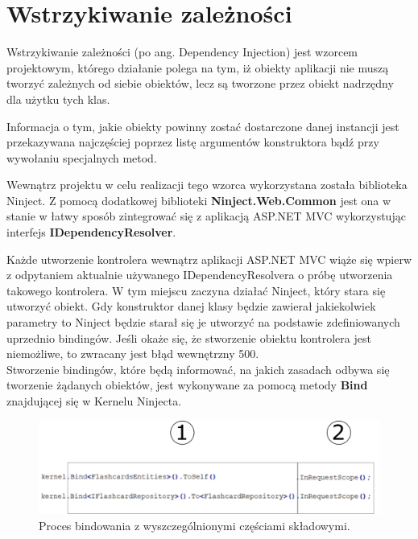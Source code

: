 \section{Wstrzykiwanie zależności}

Wstrzykiwanie zależności (po ang. Dependency Injection) jest wzorcem projektowym, którego działanie polega na tym, iż obiekty aplikacji nie muszą tworzyć zależnych od siebie obiektów, lecz są tworzone przez obiekt nadrzędny dla użytku tych klas. 

Informacja o tym, jakie obiekty powinny zostać dostarczone danej instancji jest przekazywana najczęściej poprzez listę argumentów konstruktora bądź przy wywołaniu specjalnych metod.

Wewnątrz projektu w celu realizacji tego wzorca wykorzystana została biblioteka Ninject\cite{NinjectGithub}. Z pomocą dodatkowej biblioteki \textbf{Ninject.Web.Common} jest ona w stanie w łatwy sposób zintegrować się z aplikacją ASP.NET MVC wykorzystując interfejs \textbf{IDependencyResolver}. 

Każde utworzenie kontrolera wewnątrz aplikacji ASP.NET MVC wiąże się wpierw z odpytaniem aktualnie używanego IDependencyResolvera o próbę utworzenia takowego kontrolera. W tym miejscu zaczyna działać Ninject, który stara się utworzyć obiekt. Gdy konstruktor danej klasy będzie zawierał jakiekolwiek parametry to Ninject będzie starał się je utworzyć na podstawie zdefiniowanych uprzednio bindingów. Jeśli okaże się, że stworzenie obiektu kontrolera jest niemożliwe, to zwracany jest błąd wewnętrzny 500.
\\
Stworzenie bindingów, które będą informować, na jakich zasadach odbywa się tworzenie żądanych obiektów, jest wykonywane za pomocą metody \textbf{Bind} znajdującej się w Kernelu Ninjecta.


\begin{figure}[h]
	\centering
	\includegraphics[width=\textwidth]{images/ninject.png}
	 \caption{Proces bindowania z wyszczególnionymi częściami składowymi.}
\end{figure}

